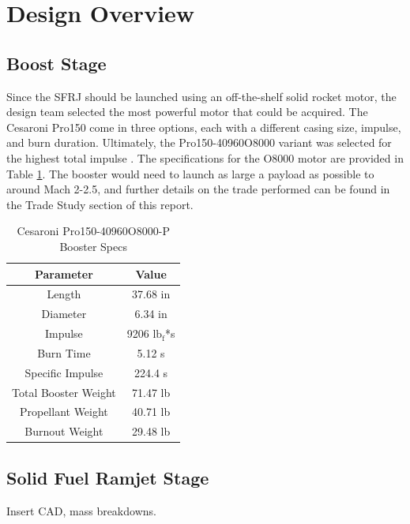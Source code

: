 \section{Design Overview}

\subsection{Boost Stage}
Since the SFRJ should be launched using an off-the-shelf solid rocket motor, the design team selected the most powerful motor that could be acquired. The Cesaroni Pro150 come in three options, each with a different casing size, impulse, and burn duration. Ultimately, the Pro150-40960O8000 variant was selected for the highest total impulse \cite{cesaroni}. The specifications for the O8000 motor are provided in Table \ref{tab:cesaroniSpecs}. The booster would need to launch as large a payload as possible to around Mach 2-2.5, and further details on the trade performed can be found in the Trade Study section of this report.

\begin{table}[H]
    \centering
    \caption{Cesaroni Pro150-40960O8000-P Booster Specs \cite{cesaroni}}
    \begin{tabular}{c|c}
    \textbf{Parameter} & \textbf{Value} \\
    \hline
         Length & 37.68 in \\
         Diameter & 6.34 in \\
         Impulse & 9206 $\text{lb}_{\text{f}}$*s \\
         Burn Time & 5.12 s \\
         Specific Impulse & 224.4 s \\
         Total Booster Weight & 71.47 lb \\
         Propellant Weight & 40.71 lb \\
         Burnout Weight & 29.48 lb \\
    \end{tabular}
    \label{tab:cesaroniSpecs}
\end{table}

\subsection{Solid Fuel Ramjet Stage}
\color{red}Insert CAD, mass breakdowns.\color{black}

